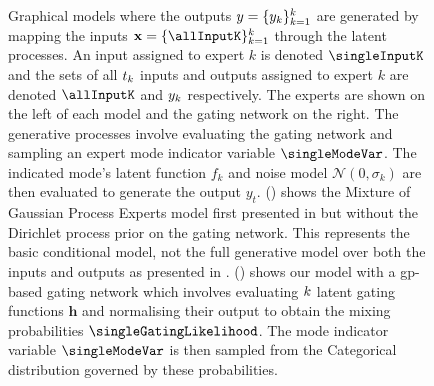 \documentclass{mimosis-class/mimosis}
\numberwithin{equation}{chapter}
\newcommand{\numData}{\ensuremath{t}}
\newcommand{\modeInd}{\ensuremath{k}}
\newcommand{\NumData}{\ensuremath{\MakeUppercase{\numData}}}
\newcommand{\ModeInd}{\ensuremath{\MakeUppercase{\modeInd}}}
\newcommand{\singleData}[1]{\ensuremath{#1_{\numData}}}
\newcommand{\allData}[1]{\ensuremath{\MakeUppercase{#1}}}
\newcommand{\allOutputK}{\ensuremath{\mode{\allOutput}}}
\newcommand{\mode}[1]{\ensuremath{#1_{\modeInd}}}
\newcommand{\x}{\ensuremath{\mathbf{x}}}
\newcommand{\y}{\ensuremath{y}}
\newcommand{\singleOutput}{\ensuremath{\singleData{\y}}}
\newcommand{\allInput}{\ensuremath{\allData{\x}}}
\newcommand{\allOutput}{\ensuremath{\allData{\y}}}
\newcommand{\noiseVar}{\ensuremath{\sigma}}
\newcommand{\noiseVarK}{\ensuremath{\mode{\noiseVar}}}
\newcommand{\gatingFunc}{\ensuremath{h}}
\newcommand{\GatingFunc}{\ensuremath{\mathbf{\gatingFunc}}}
\begin{document}
{\begin{figure}[t]
\begin{minipage}[r]{0.49\textwidth}
    \subcaption{}
\label{fig-graphical-model-gp-gating-network}
\end{minipage}
  \caption[Graphical models of nonparametric mixtures of experts]{
  Graphical models where the outputs $\allOutput = \{\allOutputK\}_{\modeInd=1}^{\ModeInd}$
are generated by mapping the inputs $\allInput = \{\allInputK\}_{\modeInd=1}^{\ModeInd}$ through the latent processes.
  An input assigned to expert $\modeInd$ is denoted $\singleInputK$
  and the sets of all $\NumData_{\modeInd}$ inputs and outputs assigned to expert $\modeInd$ are denoted
  $\allInputK$ and $\allOutputK$ respectively.
The experts are shown on the left of each model and the gating network on the right.
The generative processes involve evaluating the gating network
and sampling an expert mode indicator variable $\singleModeVar$.
The indicated mode's latent function $\mode{f}$ and noise model $\mathcal{N}(0, \noiseVarK)$ are
then evaluated to generate the output $\singleOutput$.
  () shows
   the Mixture of Gaussian Process Experts model first presented in
  \cite{rasmussenInfinite2001} but without the Dirichlet process prior on the gating network.
  This represents the basic conditional model, not the full generative model over both the inputs and outputs as
  presented in \cite{NIPS2005_f499d34b}.
  () shows our model with a \acrshort{gp}-based gating network
which involves evaluating $\ModeInd$ latent gating functions $\GatingFunc$
and normalising their output to obtain the mixing probabilities $\singleGatingLikelihood$.
The mode indicator variable $\singleModeVar$ is then sampled from the Categorical distribution
governed by these probabilities.}
\label{fig-graphical-model-comparison}
\end{figure}
\newline

}
\end{document}
